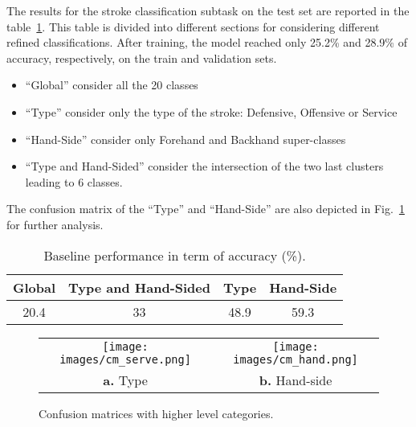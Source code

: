 \documentclass[sigconf]{acmart-me}
\begin{document}
The results for the stroke classification subtask on the test set are reported in the table~\ref{Table:Acc}. This table is divided into different sections for considering different refined classifications. After training, the model reached only 25.2\% and 28.9\% of accuracy, respectively, on the train and validation sets.
\begin{itemize}
    \item ``Global'' consider all the 20 classes
    \item ``Type'' consider only the type of the stroke: Defensive, Offensive or Service
    \item ``Hand-Side'' consider only Forehand and Backhand super-classes
    \item ``Type and Hand-Sided'' consider the intersection of the two last clusters leading to 6 classes.
\end{itemize}
The confusion matrix of the ``Type'' and ``Hand-Side'' are also depicted in Fig.~\ref{fig:confless} for further analysis.

\begin{table}
\caption{Baseline performance in term of accuracy (\%).}
\vspace{-8pt}
  \label{Table:Acc}
  \begin{tabular}{c|c|c|c}
    \toprule
    Global &Type and Hand-Sided & Type & Hand-Side\\
    \midrule
    20.4 & 33 & 48.9 & 59.3\\
  \bottomrule
\end{tabular}
\vspace{-10pt}
\end{table}

\begin{figure}
    \begin{tabular}{cc}
        \texttt{[image: images/cm\_serve.png]} &
        \texttt{[image: images/cm\_hand.png]} \\
        \textbf{a.} Type & \textbf{b.} Hand-side 
    \end{tabular}
    \vspace{-10pt}
    \caption{Confusion matrices with higher level categories.}
    \vspace{-20pt}
    \label{fig:confless}
\end{figure}
\end{document}

